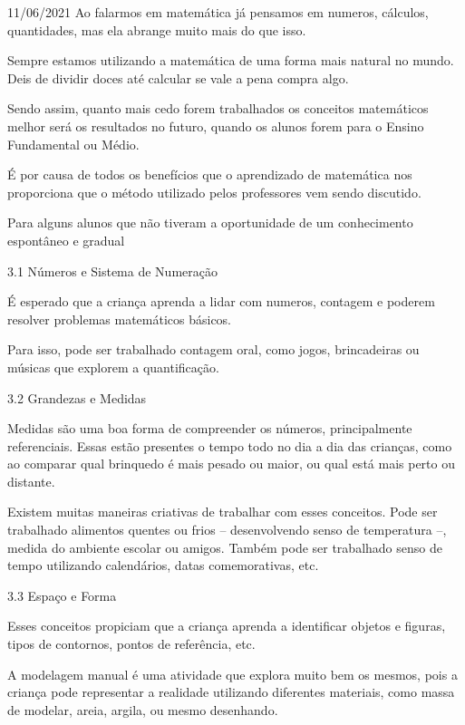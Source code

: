 \documentclass{SchoolBook}
\begin{document}
\begin{day}{11/06/2021}
        Ao falarmos em matemática já pensamos em numeros, cálculos, quantidades, mas ela abrange muito mais do que isso.
        
        Sempre estamos utilizando a matemática de uma forma mais natural no mundo. Deis de dividir doces até calcular se vale a pena compra algo.
        
        Sendo assim, quanto mais cedo forem trabalhados os conceitos matemáticos melhor será os resultados no futuro, quando os alunos forem para o Ensino Fundamental ou Médio.
        
        É por causa de todos os benefícios que o aprendizado de matemática nos proporciona que o método utilizado pelos professores vem sendo discutido.
        
        Para alguns alunos que não tiveram a oportunidade de um conhecimento espontâneo e gradual
        
        3.1 Números e Sistema de Numeração
        
        É esperado que a criança aprenda a lidar com numeros, contagem e poderem resolver problemas matemáticos básicos.
        
        Para isso, pode ser trabalhado contagem oral, como jogos, brincadeiras ou músicas que explorem a quantificação.
        
        3.2 Grandezas e Medidas
        
        Medidas são uma boa forma de compreender os números, principalmente referenciais. Essas estão presentes o tempo todo no dia a dia das crianças, como ao comparar qual brinquedo é mais pesado ou maior, ou qual está mais perto ou distante.
        
        Existem muitas maneiras criativas de trabalhar com esses conceitos. Pode ser trabalhado alimentos quentes ou frios -- desenvolvendo senso de temperatura --, medida do ambiente escolar ou amigos. Também pode ser trabalhado senso de tempo utilizando calendários, datas comemorativas, etc.
        
        3.3 Espaço e Forma
        
         Esses conceitos propiciam que a criança aprenda a identificar objetos e figuras, tipos de contornos, pontos de referência, etc.
         
         A modelagem manual é uma atividade que explora muito bem os mesmos, pois a criança pode representar a realidade utilizando diferentes materiais, como massa de modelar, areia, argila, ou mesmo desenhando.
         

\end{day}
\end{document}
